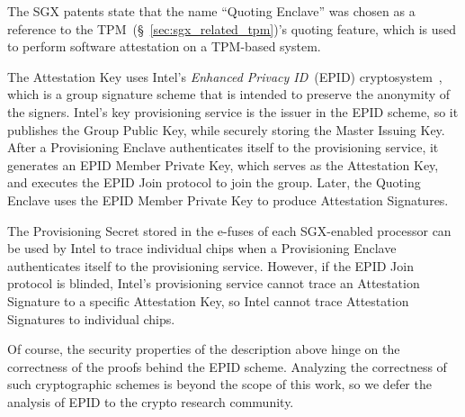 The SGX patents state that the name ``Quoting Enclave'' was chosen as a
reference to the TPM~(\S~\ref{sec:sgx_related_tpm})'s quoting feature, which is
used to perform software attestation on a TPM-based system.


The Attestation Key uses Intel's \textit{Enhanced Privacy ID}~(EPID)
cryptosystem~\cite{brickell2009epid}, which is a group signature scheme that is
intended to preserve the anonymity of the signers. Intel's key provisioning
service is the issuer in the EPID scheme, so it publishes the Group Public Key,
while securely storing the Master Issuing Key. After a Provisioning Enclave
authenticates itself to the provisioning service, it generates an EPID Member
Private Key, which serves as the Attestation Key, and executes the EPID Join
protocol to join the group. Later, the Quoting Enclave uses the EPID Member
Private Key to produce Attestation Signatures.

The Provisioning Secret stored in the e-fuses of each SGX-enabled processor can
be used by Intel to trace individual chips when a Provisioning Enclave
authenticates itself to the provisioning service. However, if the EPID Join
protocol is blinded, Intel's provisioning service cannot trace an Attestation
Signature to a specific Attestation Key, so Intel cannot trace Attestation
Signatures to individual chips.

Of course, the security properties of the description above hinge on the
correctness of the proofs behind the EPID scheme. Analyzing the correctness of
such cryptographic schemes is beyond the scope of this work, so we defer the
analysis of EPID to the crypto research community.

